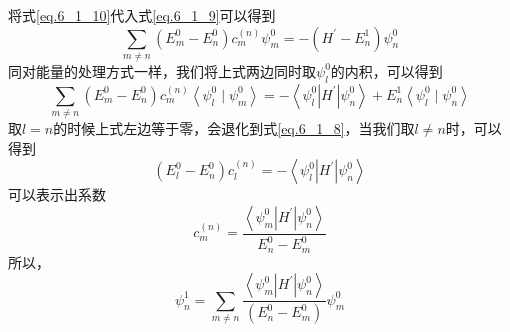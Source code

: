        将式\ref{eq.6_1_10}代入式\ref{eq.6_1_9}可以得到
        \begin{equation}
            \sum_{m \neq n}\left(E_{m}^{0}-E_{n}^{0}\right) c_{m}^{(n)} \psi_{m}^{0}=-\left(H^{\prime}-E_{n}^{1}\right) \psi_{n}^{0}
        \end{equation}
        同对能量的处理方式一样，我们将上式两边同时取$\psi_l^0$的内积，可以得到
        \begin{equation}
            \sum_{m \neq n}\left(E_{m}^{0}-E_{n}^{0}\right) c_{m}^{(n)}\left\langle\psi_{l}^{0} \mid \psi_{m}^{0}\right\rangle=-\left\langle\psi_{l}^{0}\left|H^{\prime}\right| \psi_{n}^{0}\right\rangle+E_{n}^{1}\left\langle\psi_{l}^{0} \mid \psi_{n}^{0}\right\rangle
        \end{equation}
        取$l=n$的时候上式左边等于零，会退化到式\ref{eq.6_1_8}，当我们取$l\neq n$时，可以得到
        \begin{equation}
            \left(E_{l}^{0}-E_{n}^{0}\right) c_{l}^{(n)}=-\left\langle\psi_{l}^{0}\left|H^{\prime}\right| \psi_{n}^{0}\right\rangle
        \end{equation}
        可以表示出系数
        \begin{equation}
            c_{m}^{(n)}=\frac{\left\langle\psi_{m}^{0}\left|H^{\prime}\right| \psi_{n}^{0}\right\rangle}{E_{n}^{0}-E_{m}^{0}}
        \end{equation}
        所以，
        \begin{equation}
        \label{eq.6_15}
            \boxed{\psi_{n}^{1}=\sum_{m \neq n} \frac{\left\langle\psi_{m}^{0}\left|H^{\prime}\right| \psi_{n}^{0}\right\rangle}{\left(E_{n}^{0}-E_{m}^{0}\right)} \psi_{m}^{0}}
        \end{equation}


